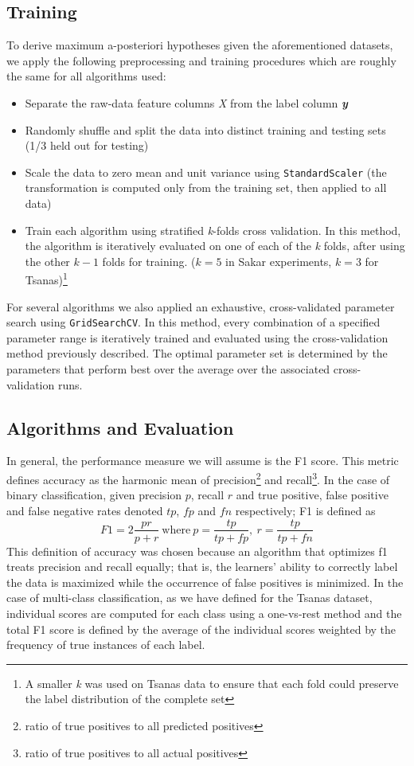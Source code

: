 \documentclass[12pt]{article}
\begin{document}
\subsection{Training}
To derive maximum a-posteriori hypotheses given the aforementioned datasets, we apply the following preprocessing and training procedures which are roughly the same for all algorithms used:
\begin{itemize}
  \item Separate the raw-data feature columns \textit{X} from the label column \textbf{\textit{y}}
  \item Randomly shuffle and split the data into distinct training and testing sets (1/3 held out for testing)
  \item Scale the data to zero mean and unit variance using \texttt{StandardScaler} (the transformation is computed only from the training set, then applied to all data)
  \item Train each algorithm using stratified \textit{k}-folds cross validation. In this method, the algorithm is iteratively evaluated on one of each of the \textit{k} folds, after using the other $k-1$ folds for training. ($k=5$ in Sakar experiments, $k=3$ for Tsanas)\footnote{A smaller \textit{k} was used on Tsanas data to ensure that each fold could preserve the label distribution of the complete set}
\end{itemize}

For several algorithms we also applied an exhaustive, cross-validated parameter search using \texttt{GridSearchCV}. In this method, every combination of a specified parameter range is iteratively trained and evaluated using the cross-validation method previously described. The optimal parameter set is determined by the parameters that perform best over the average over the associated cross-validation runs.

\subsection{Algorithms and Evaluation}
In general, the performance measure we will assume is the F1 score. This metric defines accuracy as the harmonic mean of precision\footnote{ratio of true positives to all predicted positives} and recall\footnote{ratio of true positives to all actual positives}. In the case of binary classification, given precision $p$, recall $r$ and true positive, false positive and false negative rates denoted $tp$, $fp$ and $fn$ respectively; F1 is defined as
\begin{equation}
F1 = 2\frac{pr}{p+r} \ \textrm{where} \ p = \frac{tp}{tp + fp},\ r = \frac{tp}{tp + fn}
\end{equation}
This definition of accuracy was chosen because an algorithm that optimizes f1 treats precision and recall equally; that is, the learners' ability to correctly label the data is maximized while the occurrence of false positives is minimized. In the case of multi-class classification, as we have defined for the Tsanas dataset, individual scores are computed for each class using a one-vs-rest method and the total F1 score is defined by the average of the individual scores weighted by the frequency of true instances of each label.
\end{document}
